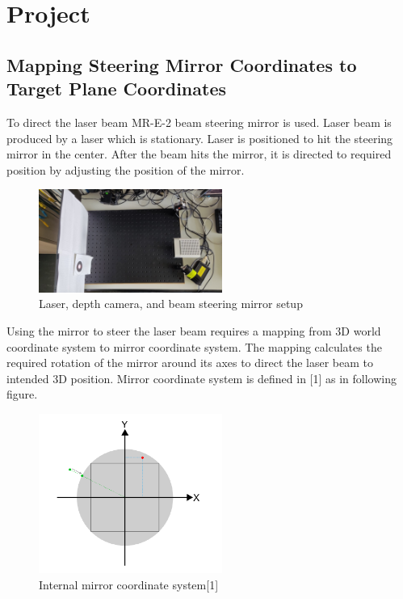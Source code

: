 \chapter{Project}
\label{ch:project}

\section{Mapping Steering Mirror Coordinates to Target Plane Coordinates}
\label{sec:Mapping Steering Mirror Coordinates to Target Plane Coordinates}

To direct the laser beam MR-E-2 beam steering mirror is used.
Laser beam is produced by a laser which is stationary. Laser
is positioned to hit the steering mirror in the center. After
the beam hits the mirror, it is directed to required position
by adjusting the position of the mirror.


\begin{figure}[!htb]\centering
    \includegraphics*[width = 6cm]{bilder/project/setup.jpg}
    \caption{Laser, depth camera, and beam steering mirror setup}
    \label{fig:setup}
\end{figure}

Using the mirror to steer the laser beam requires a mapping from
3D world coordinate system to mirror coordinate system. The
mapping calculates the required rotation of the mirror around
its axes to direct the laser beam to intended 3D position.
Mirror coordinate system is defined in [1] as in following figure.




\begin{figure}[!htb]\centering
    \includegraphics*[width = 6cm]{bilder/project/mirror_coordinates.png}
    \caption{Internal mirror coordinate system[1]}
    \label{fig:mirror_coordinates}
\end{figure}


